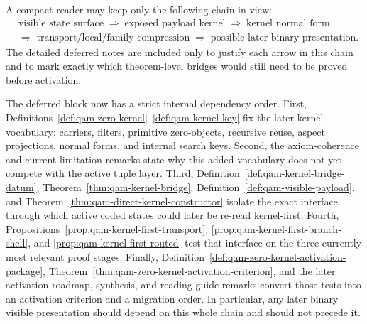 \begin{remark}\label{rem:qam-zero-kernel-reading-guide}
A compact reader may keep only the following chain in view:
\[
\begin{aligned}
&\text{visible state surface}
\;\Longrightarrow\;
\text{exposed payload kernel}
\;\Longrightarrow\;
\text{kernel normal form}
\\[0.2em]
&\Longrightarrow\;
\text{transport/local/family compression}
\;\Longrightarrow\;
\text{possible later binary presentation}.
\end{aligned}
\]
The detailed deferred notes are included only to justify each arrow in this chain and to mark exactly which theorem-level bridges would still need to be proved before activation.
\end{remark}


\begin{remark}\label{rem:qam-zero-kernel-dependency-map}
The deferred block now has a strict internal dependency order.
First, Definitions~\ref{def:qam-zero-kernel}--\ref{def:qam-kernel-key} fix the later kernel vocabulary: carriers, filters, primitive zero-objects, recursive reuse, aspect projections, normal forms, and internal search keys.
Second, the axiom-coherence and current-limitation remarks state why this added vocabulary does not yet compete with the active tuple layer.
Third, Definition~\ref{def:qam-kernel-bridge-datum}, Theorem~\ref{thm:qam-kernel-bridge}, Definition~\ref{def:qam-visible-payload}, and Theorem~\ref{thm:qam-direct-kernel-constructor} isolate the exact interface through which active coded states could later be re-read kernel-first.
Fourth, Propositions~\ref{prop:qam-kernel-first-transport}, \ref{prop:qam-kernel-first-branch-shell}, and \ref{prop:qam-kernel-first-routed} test that interface on the three currently most relevant proof stages.
Finally, Definition~\ref{def:qam-zero-kernel-activation-package}, Theorem~\ref{thm:qam-zero-kernel-activation-criterion}, and the later activation-roadmap, synthesis, and reading-guide remarks convert those tests into an activation criterion and a migration order.
In particular, any later binary visible presentation should depend on this whole chain and should not precede it.
\end{remark}

